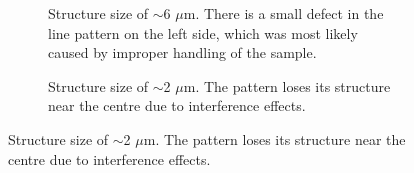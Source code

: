  \begin{figure}[!t]
     \centering
     \begin{subfigure}[t]{0.32\linewidth}
  	\centering
  	\caption{Structure size of $\sim$6 $\mu$m. There is a small defect in the line pattern on the left side, which was most likely caused by improper handling of the sample.}
  	\label{fig:b2d1_q1}
  \end{subfigure}
 \hfill
     \begin{subfigure}[t]{0.32\linewidth}
  	\centering
  	\caption{Structure size of $\sim$2 $\mu$m. The pattern loses its structure near the centre due to interference effects.}

\end{subfigure}
\end{figure}
